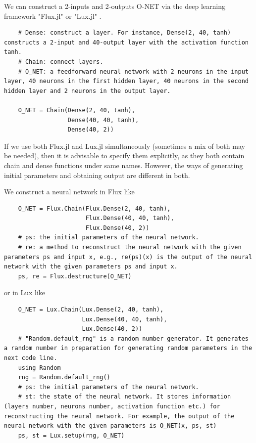 \documentclass[
	parskip, 			   %
	twoside, 			   %
	DIV=14, 			   %
	BCOR=15.0mm, 		   %
	headsepline, 		   %
	open=right, 		   %
	captions=tableheading, %
	bibliography=totoc,    %
	numbers=noenddot       %
]{scrreprt}
\begin{document}
 We can construct a 2-inputs and 2-outputs O-NET via the deep learning framework "Flux.jl" or "Lux.jl" \cite{Pal:2022}.
\begin{verbatim}
    # Dense: construct a layer. For instance, Dense(2, 40, tanh) constructs a 2-input and 40-output layer with the activation function tanh.
    # Chain: connect layers.
    # O_NET: a feedforward neural network with 2 neurons in the input layer, 40 neurons in the first hidden layer, 40 neurons in the second hidden layer and 2 neurons in the output layer.

    O_NET = Chain(Dense(2, 40, tanh),
                  Dense(40, 40, tanh),
                  Dense(40, 2))
\end{verbatim}

If we use both Flux.jl and Lux.jl simultaneously (sometimes a mix of both may be needed), then it is advisable to specify them explicitly, as they both contain chain and dense functions under same names. However, the ways of generating initial parameters and obtaining output are different in both.

We construct a neural network in Flux like
\begin{verbatim}
    O_NET = Flux.Chain(Flux.Dense(2, 40, tanh),
                       Flux.Dense(40, 40, tanh),
                       Flux.Dense(40, 2))
    # ps: the initial parameters of the neural network. 
    # re: a method to reconstruct the neural network with the given parameters ps and input x, e.g., re(ps)(x) is the output of the neural network with the given parameters ps and input x.
    ps, re = Flux.destructure(O_NET)
\end{verbatim}

or in Lux like
\begin{verbatim}
    O_NET = Lux.Chain(Lux.Dense(2, 40, tanh),
                      Lux.Dense(40, 40, tanh),
                      Lux.Dense(40, 2))
    # "Random.default_rng" is a random number generator. It generates a random number in preparation for generating random parameters in the next code line.
    using Random
    rng = Random.default_rng()
    # ps: the initial parameters of the neural network.
    # st: the state of the neural network. It stores information (layers number, neurons number, activation function etc.) for reconstructing the neural network. For example, the output of the neural network with the given parameters is O_NET(x, ps, st)
    ps, st = Lux.setup(rng, O_NET)
\end{verbatim}
\end{document}
